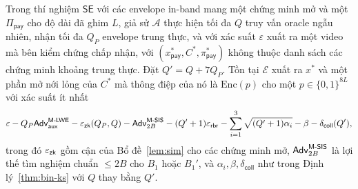 \begin{theorem}
\label{thm:pay-se}
Trong thí nghiệm $\mathsf{SE}$ với các envelope in-band mang một chứng minh mở
và một $\Pi_{\mathsf{pay}}$ cho độ dài đã ghim $L$, giả sử $\mathcal A$ thực
hiện tối đa $Q$ truy vấn oracle ngẫu nhiên, nhận tối đa $Q_P$ envelope trung
thực, và với xác suất $\varepsilon$ xuất ra một video mà bên kiểm chứng chấp
nhận, với $(x^*_{\mathsf{pay}},C^*,\pi^*_{\mathsf{pay}})$ không thuộc danh sách
các chứng minh khoảng trung thực. Đặt $Q'=Q+7Q_P$. Tồn tại $\mathcal E$ xuất ra
$x^*$ và một phần mở nới lỏng của $C^*$ mà thông điệp của nó là
$\mathrm{Enc}(p)$ cho một $p\in\{0,1\}^{8L}$ với xác suất ít nhất
\[
\varepsilon-Q_P\mathsf{Adv}^{\textsf{M-LWE}}_{\mathsf{aux}}-\varepsilon_{\mathsf{zk}}(Q_P,Q)-\mathsf{Adv}^{\textsf{M-SIS}}_{2B}
-(Q'+1)\varepsilon_{\mathsf{rbr}}-\sum_{i=1}^3\sqrt{(Q'+1)\alpha_i}-\beta-\delta_{\mathsf{coll}}(Q'),
\]
trong đó $\varepsilon_{\mathsf{zk}}$ gồm cận của Bổ đề~\ref{lem:sim} cho các chứng minh mở,
$\mathsf{Adv}^{\textsf{M-SIS}}_{2B}$ là lợi thế tìm nghiệm \MSIS{} chuẩn $\le2B$ cho $B_1$ hoặc
$B_1'$, và $\alpha_i,\beta,\delta_{\mathsf{coll}}$ như trong
Định lý~\ref{thm:bin-ks} với $Q$ thay bằng $Q'$.
\end{theorem}
